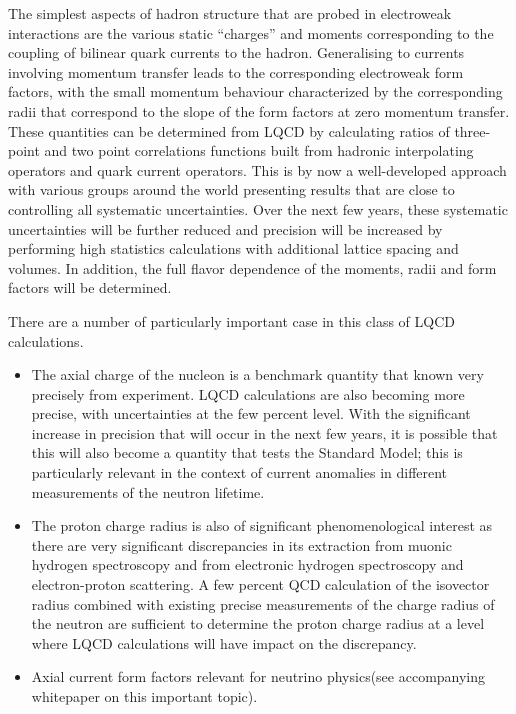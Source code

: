 The simplest aspects of hadron structure that are probed in electroweak interactions are the various static ``charges'' and moments corresponding to the coupling of bilinear quark currents to the hadron. Generalising to currents involving momentum transfer leads to the corresponding electroweak form factors, with the small momentum behaviour characterized by the corresponding radii that correspond to the slope of the form factors at zero momentum transfer. These quantities can be determined from LQCD by calculating ratios of three-point and two point correlations functions built from hadronic interpolating operators and quark current operators. This is by now a well-developed approach with various groups around the world presenting results that are close to controlling all systematic uncertainties. Over the next few years, these systematic uncertainties will be further reduced  and  precision will be increased by performing high statistics calculations with additional lattice spacing and volumes. In addition, the full flavor dependence of the moments, radii and form factors will be determined. 

There are a number of particularly important case in this class of LQCD calculations. 
\begin{itemize}
	\item The axial charge of the nucleon is a benchmark quantity that known very precisely from experiment. LQCD calculations are also becoming more precise, with uncertainties at the few percent level. With the significant increase in precision that will occur in the next few years, it is possible that this will also become a quantity that tests the Standard Model; this is particularly relevant in the context of current anomalies in different measurements of the neutron lifetime.
	\item The proton charge radius is also of significant phenomenological interest as there are very significant discrepancies in its extraction from muonic hydrogen spectroscopy  and from electronic hydrogen spectroscopy and electron-proton scattering. A few percent QCD calculation of the isovector radius combined with existing precise measurements of the charge radius of the neutron are sufficient to determine the proton charge radius at a level where  LQCD calculations will  have impact on the discrepancy.
	\item Axial current form factors relevant for neutrino physics(see accompanying whitepaper on this important topic).
\end{itemize} 


